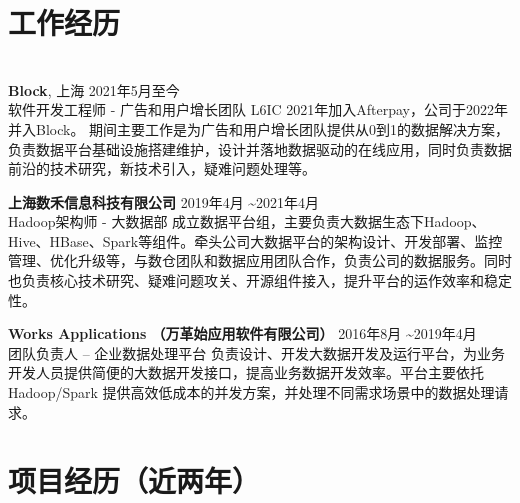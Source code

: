 \documentclass{res}[8.5pt]
\begin{document}
\thispagestyle{empty} %

\address{{\bf 地址:} 虹口区天宝路466弄, 200086 \hspace{0.25in}  {\bf 电话:} 18017661124 \hspace{0.25in}  {\bf   Email:} dd.famous@gmail.com}

\begin{resume}

\section{{工作经历}}
\vspace{-12pt}
\hrulefill\\
{\bf Block}, 上海 \hfill 2021年5月至今 \\
软件开发工程师 - 广告和用户增长团队 L6IC  \hspace{0.25in} 2021年加入Afterpay，公司于2022年并入Block。
期间主要工作是为广告和用户增长团队提供从0到1的数据解决方案，负责数据平台基础设施搭建维护，设计并落地数据驱动的在线应用，同时负责数据前沿的技术研究，新技术引入，疑难问题处理等。 

\vspace{-10pt}
{\bf 上海数禾信息科技有限公司} \hfill 2019年4月  \textasciitilde 2021年4月\\
Hadoop架构师 - 大数据部    \hspace{0.25in} 
成立数据平台组，主要负责大数据生态下Hadoop、Hive、HBase、Spark等组件。牵头公司大数据平台的架构设计、开发部署、监控管理、优化升级等，与数仓团队和数据应用团队合作，负责公司的数据服务。同时也负责核心技术研究、疑难问题攻关、开源组件接入，提升平台的运作效率和稳定性。

\vspace{-10pt}
{\bf Works Applications （万革始应用软件有限公司）} \hfill 2016年8月 \textasciitilde 2019年4月\\
团队负责人 – 企业数据处理平台 \hspace{0.25in} 
负责设计、开发大数据开发及运行平台，为业务开发人员提供简便的大数据开发接口，提高业务数据开发效率。平台主要依托 Hadoop/Spark 提供高效低成本的并发方案，并处理不同需求场景中的数据处理请求。

\section{{项目经历（近两年）}}
\vspace{-12pt}
\hrulefill\\


\end{resume}
\end{document}

